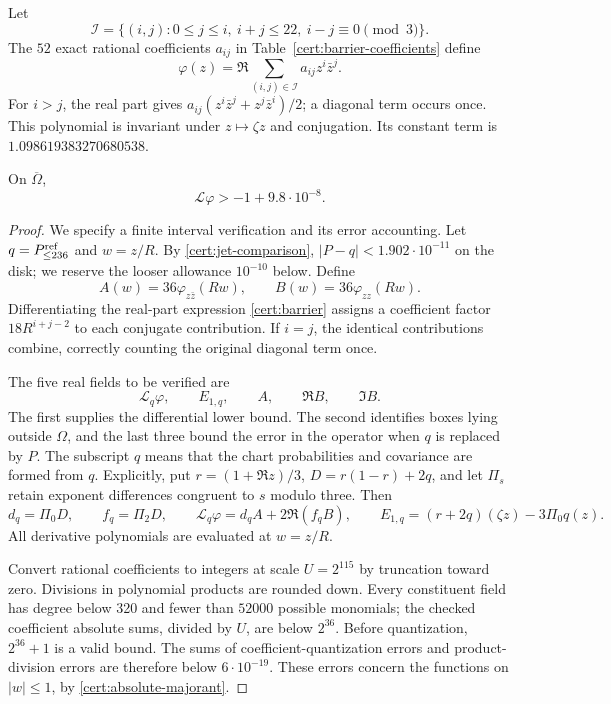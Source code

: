 Let
\[
 \mathcal I=\{(i,j):0\leq j\leq i,\ i+j\leq22,\ i-j\equiv0\pmod3\}.
\]
The $52$ exact rational coefficients $a_{ij}$ in
Table~\ref{cert:barrier-coefficients} define
\begin{equation}\label{cert:barrier}
 \varphi(z)=\Re\sum_{(i,j)\in\mathcal I}a_{ij}z^i\bar z^j.
\end{equation}
For $i>j$, the real part gives
$a_{ij}(z^i\bar z^j+z^j\bar z^i)/2$; a diagonal term occurs once.
This polynomial is invariant under $z\mapsto\zeta z$
and conjugation.  Its constant term is $1.098619383270680538$.

\begin{lemma}\label{cert:interior-lemma}
On $\overline\Omega$,
\[
 \mathcal L\varphi>-1+9.8\cdot10^{-8}.
\]
\end{lemma}
\begin{proof}
We specify a finite interval verification and its error accounting.  Let
$q=P^{\rm ref}_{\leq236}$ and $w=z/R$.  By
\eqref{cert:jet-comparison}, $|P-q|<1.902\cdot10^{-11}$ on the disk;
we reserve the looser allowance $10^{-10}$ below.  Define
\[
 A(w)=36\varphi_{z\bar z}(Rw),\qquad B(w)=36\varphi_{zz}(Rw).
\]
Differentiating the real-part expression \eqref{cert:barrier} assigns a
coefficient factor $18R^{i+j-2}$ to each conjugate contribution.  If $i=j$,
the identical contributions combine, correctly counting the original
diagonal term once.

The five real fields to be verified are
\begin{equation}\label{cert:five-fields}
 \mathcal L_q\varphi,\qquad E_{1,q},\qquad A,\qquad \Re B,\qquad\Im B.
\end{equation}
The first supplies the differential lower bound.  The second identifies
boxes lying outside $\Omega$, and the last three bound the error in the
operator when $q$ is replaced by $P$.
The subscript $q$ means that the chart probabilities and covariance are
formed from $q$.  Explicitly, put $r=(1+\Re z)/3$,
$D=r(1-r)+2q$, and let $\Pi_s$ retain exponent differences congruent to
$s$ modulo three.  Then
\[
 d_q=\Pi_0D,\qquad f_q=\Pi_2D,\qquad
 \mathcal L_q\varphi=d_qA+2\Re(f_qB),\qquad
 E_{1,q}=(r+2q)(\zeta z)-3\Pi_0q(z).
\]
All derivative polynomials are evaluated at $w=z/R$.

Convert rational coefficients to integers at scale $U=2^{115}$ by
truncation toward zero.  Divisions in polynomial products are rounded down.
Every constituent field has degree below 320 and fewer than $52000$
possible monomials; the checked coefficient absolute sums, divided by $U$,
are below $2^{36}$.  Before quantization, $2^{36}+1$ is a valid bound.
The sums of coefficient-quantization errors and product-division errors
are therefore below $6\cdot10^{-19}$.  These errors concern the functions
on $|w|\leq1$, by \eqref{cert:absolute-majorant}.


\end{proof}
